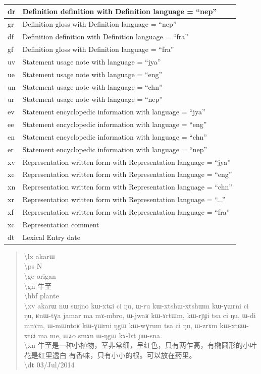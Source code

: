 \documentclass[a4paper,12pt]{article}
\newcommand{\ipa}[1]{{\phon #1}}
\newcommand{\zh}[1]{{\cn #1}}
\begin{document}
\begin{center}
\begin{longtable}{|p{4cm}|p{11cm}|}
dr & Definition definition with Definition language = ``nep'' \\ \hline
gr & Definition gloss with Definition language = ``nep'' \\ \hline
df & Definition definition with Definition language = ``fra'' \\ \hline
gf & Definition gloss with Definition language = ``fra'' \\ \hline
uv & Statement usage note with language = ``jya'' \\ \hline
ue & Statement usage note with language = ``eng'' \\ \hline
un & Statement usage note with language = ``chn'' \\ \hline
ur & Statement usage note with language = ``nep'' \\ \hline
ev & Statement encyclopedic information with language = ``jya'' \\ \hline
ee & Statement encyclopedic information with language = ``eng'' \\ \hline
en & Statement encyclopedic information with language = ``chn'' \\ \hline
er & Statement encyclopedic information with language = ``nep'' \\ \hline
xv & Representation written form with Representation language = ``jya'' \\ \hline
xe & Representation written form with Representation language = ``eng'' \\ \hline
xn & Representation written form with Representation language = ``chn'' \\ \hline
xr & Representation written form with Representation language = ``...'' \\ \hline
xf & Representation written form with Representation language = ``fra'' \\ \hline
xc & Representation comment \\ \hline
dt & Lexical Entry date \\ \hline
\end{longtable}
\end{center}

\pagebreak

\begin{quote}
\textbackslash lx \ipa{akarɯ} \\
\textbackslash ps N \\
\textbackslash ge origan \\
\textbackslash gn \zh{牛至} \\
\textbackslash hbf plante \\
\textbackslash xv \ipa{akarɯ nɯ sɯjno kɯ-xtɕi ci ŋu, ɯ-ru kɯ-xtshɯ-xtshɯm kɯ-ɣɯrni ci ŋu, ʁnɯ-tɣa jamar ma mɤ-mbro, ɯ-jwaʁ kɯ-ɤrtɯm, kɯ-rɲɟi tsa ci ŋu, ɯ-di mnɤm, ɯ-mɯntoʁ kɯ-ɣɯrni ŋgɯ kɯ-wɣrum tsa ci ŋu, ɯ-zrɤm kɯ-xtɕɯ-xtɕi ma me, ɯʑo smɤn ɯ-ŋgɯ kɤ-lɤt ɲɯ-sna.} \\
\textbackslash xn \zh{牛至是一种小植物，茎非常细，呈红色，只有两乍高，有椭圆形的小叶
花是红里透白 有香味，只有小小的根。可以放在药里。} \\
\textbackslash dt 03/Jul/2014
\end{quote}
\end{document}
